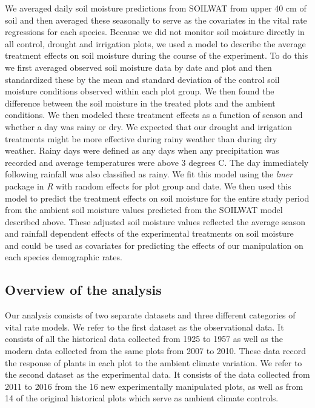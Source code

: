 \documentclass[11pt]{article}
\begin{document}
\begin{doublespacing}
We averaged daily soil moisture predictions from SOILWAT from upper 40 cm of soil and then averaged these seasonally to serve as the covariates in the vital rate regressions for each species. Because we did not monitor soil moisture directly in all control, drought and irrigation plots, we used a model to describe the average treatment effects on soil moisture during the course of the experiment. To do this we first averaged observed soil moisture data by date and plot and then standardized these by the mean and standard deviation of the control soil moisture conditions observed within each plot group. We then found the difference between the soil moisture in the treated plots and the ambient conditions. We then modeled these treatment effects as a function of season and whether a day was rainy or dry. We expected that our drought and irrigation treatments might be more effective during rainy weather than during dry weather. Rainy days were defined as any days when any precipitation was recorded and average temperatures were above 3 degrees C. The day immediately following rainfall was also classified as rainy. We fit this model using the \textit{lmer} package in \textit{R} \citep{bates} with random effects for plot group and date. We then used this model to predict the treatment effects on soil moisture for the entire study period from the ambient soil moisture values predicted from the SOILWAT model described above. These adjusted soil moisture values reflected the average season and rainfall dependent effects of the experimental treatments on soil moisture and could be used as covariates for predicting the effects of our manipulation on each species demographic rates. 


\subsection*{Overview of the analysis}

Our analysis consists of two separate datasets and three different categories of vital rate models. We refer to the first dataset as the observational data. It consists of all the historical data collected from 1925 to 1957 as well as the modern data collected from the same plots from 2007 to 2010. These data record the response of plants in each plot to the ambient climate variation. We refer to the second dataset as the experimental data.  It consists of the data collected from 2011 to 2016 from the 16 new experimentally manipulated plots, as well as from 14 of the original historical plots which serve as ambient climate controls.  


\end{doublespacing}
\end{document}
